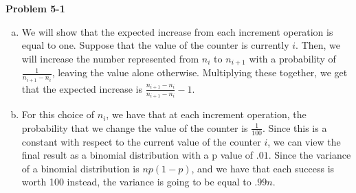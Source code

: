 \documentclass{article}
\begin{document}
\noindent\textbf{Problem 5-1}\\

\begin{enumerate}[a.]
\item
We will show that the expected increase from each increment operation is equal to one. Suppose that the value of the counter is currently $i$. Then, we will increase the number represented from $n_{i}$ to $n_{i+1}$ with a probability of $\frac{1}{n_{i+1} - n_i}$, leaving the value alone otherwise. Multiplying these together, we get that the expected increase is $\frac{n_{i+1} - n_i}{n_{i+1} - n_i} - 1$.
\item
For this choice of $n_i$, we have that at each increment operation, the probability that we change the value of the counter is $\frac{1}{100}$. Since this is a constant with respect to the current value of the counter $i$, we can view the final result as a binomial distribution with a p value of $.01$. Since the variance of a binomial distribution is $np(1-p)$, and we have that each success is worth 100 instead, the variance is going to be equal to $.99n$.
\end{enumerate}
\end{document}
